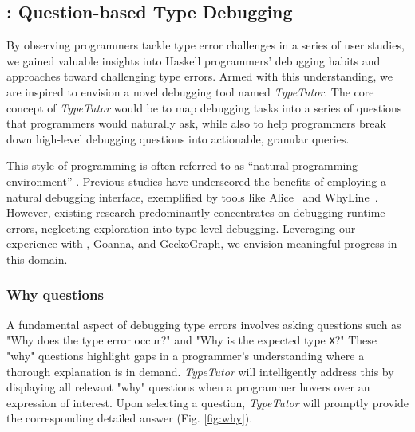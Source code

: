 \subsection{\typetutor: Question-based Type Debugging}

By observing programmers tackle type error challenges in a series of user studies, we gained valuable insights into Haskell programmers' debugging habits and approaches toward challenging type errors. Armed with this understanding, we are inspired to envision a novel debugging tool named \textit{TypeTutor}. The core concept of \textit{TypeTutor} would be to map debugging tasks into a series of questions that programmers would naturally ask, while also to help programmers break down high-level debugging questions into actionable, granular queries.

This style of programming is often referred to as ``natural programming environment'' \cite{Myers2004-fy}. Previous studies have underscored the benefits of employing a natural debugging interface, exemplified by tools like Alice~\cite{Conway2000-nn} and WhyLine~\cite{Ko2009-uf}. However, existing research predominantly concentrates on debugging runtime errors, neglecting exploration into type-level debugging.  Leveraging our experience with \chameleon{}, Goanna, and GeckoGraph, we envision meaningful progress in this domain.


\subsubsection{Why questions}

A fundamental aspect of debugging type errors involves asking questions such as "Why does the type error occur?" and "Why is the expected type \texttt{X}?" These "why" questions highlight gaps in a programmer's understanding where a thorough explanation is in demand. \textit{TypeTutor} will intelligently address this by displaying all relevant "why" questions when a programmer hovers over an expression of interest. Upon selecting a question, \textit{TypeTutor} will promptly provide the corresponding detailed answer (Fig. \ref{fig:why}).



